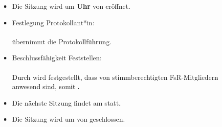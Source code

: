 \documentclass[
appendixprefix=true,
a4paper,                    %
11pt,                       %
oneside,                    %
parskip=half-,              %
]{scrartcl}
\begin{document}
  \makeTitle
  \makePreamble
  \tableofcontents


  \makeAttendance

	\newpage

  \begin{itemize}
    \item {Die Sitzung wird um \textbf{\meetingStartTime \space Uhr} von \textbf{\chair} eröffnet.}
    \item {Festlegung Protokollant*in: \\ \\
      \textbf{\recorder} übernimmt die Protokollführung.}
    \item {Beschlussfähigkeit Feststellen: \\ \\
      Durch \textbf{\chair} wird festgestellt, dass
      \textbf{\meetingAttendence} von \textbf{\meetingAttendenceMax}
      stimmberechtigten FsR-Mitgliedern anwesend sind, somit \textbf{\quorum .}}
  \end{itemize}

  

  \begin{itemize}
    \item {Die nächste Sitzung findet am \textbf{\meetingNext} statt.}
    \item {Die Sitzung wird um \textbf{\meetingEndTime} von \textbf{\chair} geschlossen.}
  \end{itemize}
  \makePostamble
\end{document}
